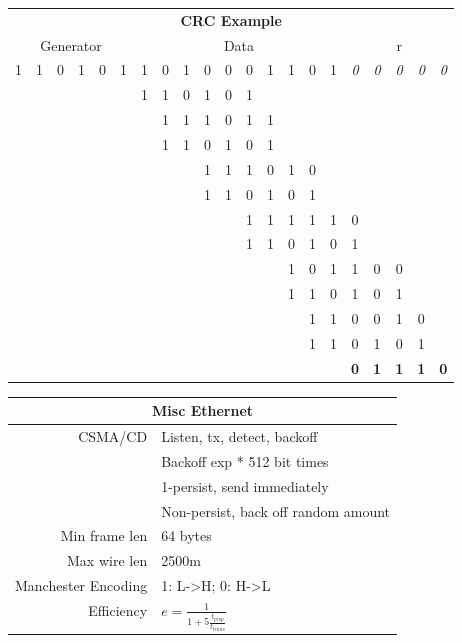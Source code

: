 \documentclass{article}
\begin{document}
\begin{tabular}{ccccccccccccccccccccc}
\multicolumn{21}{c}{\textbf{CRC Example}}\\
\multicolumn{6}{c}{Generator} & \multicolumn{10}{c}{Data} & \multicolumn{5}{c}{r}\\
\cline{7-21}
1 & 1 & 0 & 1 & 0 & 1 & \multicolumn{1}{|c}{1} & 0 & 1 & 0 & 0 & 0 & 1 & 1 & 0 & 1 & \textit{0} & \textit{0} & \textit{0} & \textit{0} & \textit{0}\\
\multicolumn{6}{c}{} & 1 & 1 & 0 & 1 & 0 & 1\\
\cline{7-12}
\multicolumn{7}{c}{} & 1 & 1 & 1 & 0 & 1 & 1\\
\multicolumn{7}{c}{} & 1 & 1 & 0 & 1 & 0 & 1\\
\cline{8-13}
\multicolumn{9}{c}{} & 1 & 1 & 1 & 0 & 1 & 0\\
\multicolumn{9}{c}{} & 1 & 1 & 0 & 1 & 0 & 1\\
\cline{10-15}
\multicolumn{11}{c}{} & 1 & 1 & 1 & 1 & 1 & 0\\
\multicolumn{11}{c}{} & 1 & 1 & 0 & 1 & 0 & 1\\
\cline{12-17}
\multicolumn{13}{c}{} & 1 & 0 & 1 & 1 & 0 & 0\\
\multicolumn{13}{c}{} & 1 & 1 & 0 & 1 & 0 & 1\\
\cline{14-19}
\multicolumn{14}{c}{} & 1 & 1 & 0 & 0 & 1 & 0\\
\multicolumn{14}{c}{} & 1 & 1 & 0 & 1 & 0 & 1\\
\cline{15-20}
\multicolumn{16}{c}{} & \textbf{0} & \textbf{1} & \textbf{1} & \textbf{1} & \textbf{0}\\
\end{tabular}
\begin{tabular}{|rl|}
\hline
\multicolumn{2}{|c|}{\textbf{Misc Ethernet}}\\
\hline
CSMA/CD & Listen, tx, detect, backoff\\
	& Backoff exp * 512 bit times\\
        & 1-persist, send immediately\\
        & Non-persist, back off random amount\\
Min frame len & 64 bytes\\
Max wire len & 2500m\\
Manchester Encoding & 1: L-\textgreater H; 0: H-\textgreater L\\
Efficiency & $e=\frac{1}{1+5\frac{t_{prop}}{t_{trans}}}$\\
\hline
\end{tabular}
\end{document}
